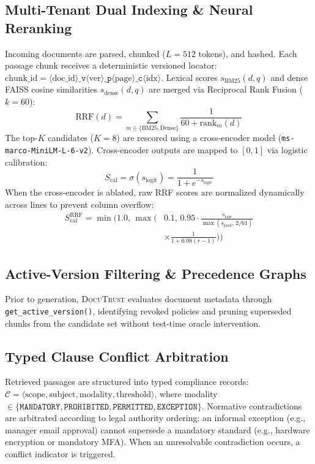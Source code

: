 \documentclass[journal,twoside]{IEEEtran}
\newcommand{\sysname}{\textsc{DocuTrust}}
\begin{document}
\subsection{Multi-Tenant Dual Indexing \& Neural Reranking}
Incoming documents are parsed, chunked ($L=512$ tokens), and hashed.
Each passage chunk receives a deterministic versioned locator: $\text{chunk\_id} = \langle\text{doc\_id}\rangle\texttt{\_v}\langle\text{ver}\rangle\texttt{\_p}\langle\text{page}\rangle\texttt{\_c}\langle\text{idx}\rangle$.
Lexical scores $s_{\text{BM25}}(d, q)$ and dense FAISS cosine similarities $s_{\text{dense}}(d, q)$ are merged via Reciprocal Rank Fusion ($k=60$):
\begin{equation}
  \text{RRF}(d) = \sum_{m \in \{\text{BM25}, \text{Dense}\}} \frac{1}{60 + \text{rank}_m(d)}
  \label{eq:rrf}
\end{equation}
The top-$K$ candidates ($K=8$) are rescored using a cross-encoder model (\texttt{ms-marco-MiniLM-L-6-v2}).
Cross-encoder outputs are mapped to $[0, 1]$ via logistic calibration:
\begin{equation}
  S_{\text{cal}} = \sigma(s_{\text{logit}}) = \frac{1}{1 + e^{-s_{\text{logit}}}}
  \label{eq:ce_cal}
\end{equation}
When the cross-encoder is ablated, raw RRF scores are normalized dynamically across lines to prevent column overflow:
\begin{align}
  S_{\text{cal}}^{\text{RRF}} = \min\Big(1.0,\, \max\Big(&0.1,\, 0.95 \cdot \frac{s_{\text{raw}}}{\max(s_{\text{pool}},\, 2/61)} \nonumber \\
  &\times \frac{1}{1 + 0.08(r-1)}\Big)\Big)
  \label{eq:rrf_cal}
\end{align}

\subsection{Active-Version Filtering \& Precedence Graphs}
Prior to generation, \sysname{} evaluates document metadata through \texttt{get\_active\_version()}, identifying revoked policies and pruning superseded chunks from the candidate set without test-time oracle intervention.

\subsection{Typed Clause Conflict Arbitration}
Retrieved passages are structured into typed compliance records:
$\mathcal{C} = \langle \text{scope}, \text{subject}, \text{modality}, \text{threshold} \rangle$,
where modality $\in \{\texttt{MANDATORY}, \texttt{PROHIBITED}, \texttt{PERMITTED}, \texttt{EXCEPTION}\}$.
Normative contradictions are arbitrated according to legal authority ordering:
an informal exception (e.g., manager email approval) cannot supersede a mandatory standard (e.g., hardware encryption or mandatory MFA).
When an unresolvable contradiction occurs, a conflict indicator is triggered.
\end{document}
